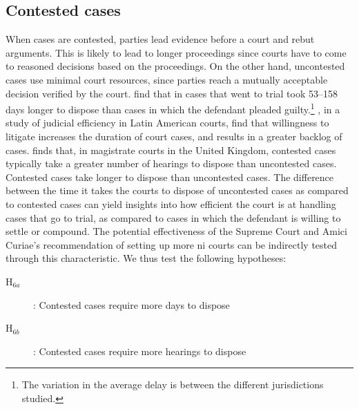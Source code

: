 \subsection{Contested cases}
\label{sec:contested_cases_meth}
When cases are contested, parties lead evidence before a court and rebut arguments. This is likely to lead to longer proceedings since courts have to come to reasoned decisions based on the proceedings. On the other hand, uncontested cases use minimal court resources, since parties reach a mutually acceptable decision verified by the court. \textcite{ostrom2000efficiency} find that in cases that went to trial took 53--158 days longer to dispose than cases in which the defendant pleaded guilty.\footnote{The variation in the average delay is between the different jurisdictions studied.} \textcite{buscaglia1997_latinAmericaCourtDelays}, in a study of judicial efficiency in Latin American courts, find that willingness to litigate increases the duration of court cases, and results in a greater backlog of cases. \textcite{crownProsecutionService2006_magistrateCourtEfficiency} finds that, in magistrate courts in the United Kingdom, contested cases typically take a greater number of hearings to dispose than uncontested cases. Contested cases take longer to dispose than uncontested cases. The difference between the time it takes the courts to dispose of uncontested cases as compared to contested cases can yield insights into how efficient the court is at handling cases that go to trial, as compared to cases in which the defendant is willing to settle or compound. The potential effectiveness of the Supreme Court and Amici Curiae's recommendation of setting up more \gls{ni} courts can be indirectly tested through this characteristic. We thus test the following hypotheses:

\begin{description}
\item[H$_{6a}$] : Contested cases require more days to dispose
\item[H$_{6b}$] : Contested cases require more hearings to dispose
\end{description}

